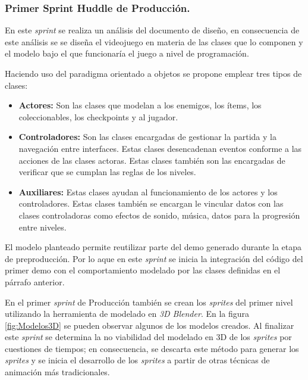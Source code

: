 \subsubsection{Primer Sprint Huddle de Producción.}
En este \textit{sprint} se realiza un análisis del documento de diseño, en consecuencia 
de este análisis se se diseña el videojuego en materia de las clases que lo 
componen y el modelo bajo el que funcionaría el juego a nivel de programación. 
\\
\par
Haciendo uso del paradigma orientado a objetos se propone emplear tres tipos 
de clases:
\begin{itemize}
        \item \textbf{Actores:} Son las clases que modelan a los enemigos, los ítems, 
        los coleccionables, los checkpoints y al jugador.
        \item \textbf{Controladores:} Son las clases encargadas de gestionar la partida 
        y la navegación entre interfaces. Estas clases desencadenan eventos conforme a 
        las acciones de las clases actoras. Estas clases también son las encargadas de 
        verificar que se cumplan las reglas de los niveles.
        \item \textbf{Auxiliares:} Estas clases ayudan al funcionamiento de los actores 
        y los controladores. Estas clases también se encargan le vincular datos con 
        las clases controladoras como efectos de sonido, música, datos para la 
        progresión entre niveles.
\end{itemize}
El modelo planteado permite reutilizar parte del demo generado durante la etapa 
de preproducción. Por lo aque en este \textit{sprint} se inicia la integración 
del código del primer demo con el comportamiento modelado por las clases definidas 
en el párrafo anterior. 
\\
\par
En el primer \textit{sprint} de Producción también se crean los \textit{sprites} del 
primer nivel utilizando la herramienta de modelado en \textit{3D Blender}. En la
figura \ref{fig:Modelos3D} se pueden observar algunos de los modelos creados. Al 
finalizar este \textit{sprint} se determina la no viabilidad del modelado en 3D de los 
\textit{sprites} por cuestiones de tiempos; en consecuencia, se descarta este 
método para generar los \textit{sprites} y se inicia el desarrollo de los 
\textit{sprites} a partir de otras técnicas de animación más tradicionales.

